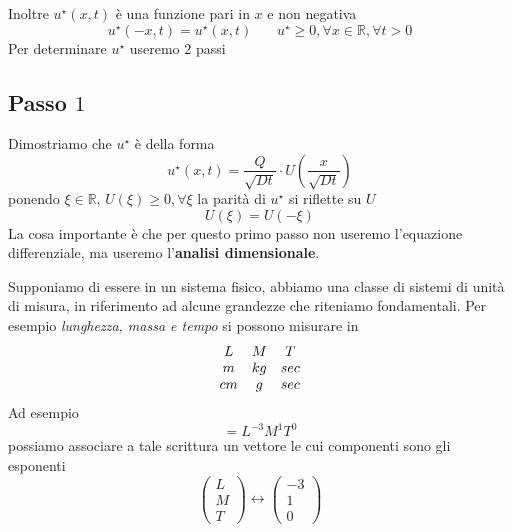 Inoltre $u^{\star }(x,t)$ è una funzione pari in $x$ e non negativa
\begin{equation*}
    u^{\star }(-x,t) =u^{\star }(x,t) \ \ \ \ \ \ \ \ u^{\star } \geq 0,\forall x\in \mathbb{R},\forall t >0
\end{equation*}
Per determinare $u^{\star }$ useremo $2$ passi
\subsection{Passo \texorpdfstring{$1$}{1}}

Dimostriamo che $u^{\star }$ è della forma
\begin{equation*}
    u^{\star }(x,t) =\frac{Q}{\sqrt{Dt}} \cdotp U\left(\frac{x}{\sqrt{Dt}}\right)
\end{equation*}
ponendo $\xi \in \mathbb{R}$, $U(\xi) \geq 0,\forall \xi $ la parità di $u^{\star }$ si riflette su $U$
\begin{equation*}
    U(\xi) =U(-\xi)
\end{equation*}
La cosa importante è che per questo primo passo non useremo l'equazione differenziale, ma useremo l'\textbf{analisi dimensionale}.
\begin{oss}
     Supponiamo di essere in un sistema fisico, abbiamo una classe di sistemi di unità di misura, in riferimento ad alcune grandezze che riteniamo fondamentali. Per esempio \textit{lunghezza, massa e tempo} si possono misurare in
    \begin{equation*}
        \begin{array}{ c c c }
            L  & M  & T   \\
            m  & kg & sec \\
            cm & g  & sec
        \end{array}
    \end{equation*}
    Ad esempio
    \begin{equation*}
        [ \rho ] =L^{-3} M^{1} T^{0}
    \end{equation*}
    possiamo associare a tale scrittura un vettore le cui componenti sono gli esponenti
    \begin{equation*}
        \begin{pmatrix}
            L \\
            M \\
            T
        \end{pmatrix} \leftrightarrow \begin{pmatrix}
            -3 \\
            1  \\
            0
        \end{pmatrix}
    \end{equation*}
\end{oss}
